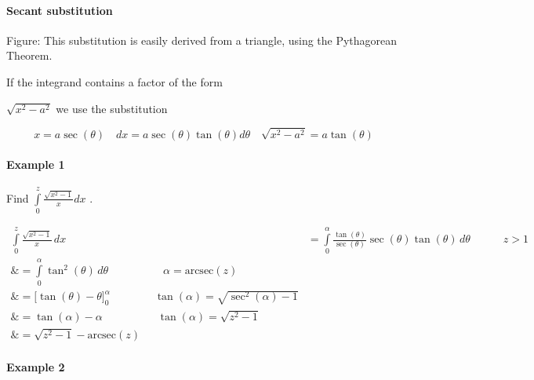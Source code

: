 \paragraph{Secant substitution}






Figure: This substitution is easily derived from a triangle, using the Pythagorean Theorem.



If the integrand contains a factor of the form

$\displaystyle\sqrt{x^2-a^2}$ we use the substitution



$$x=a\sec(\theta)\quad dx=a\sec(\theta)\tan(\theta)d\theta\quad\sqrt{x^2-a^2}=a\tan(\theta)$$



\paragraph{Example 1}



Find $\int\limits _0^z \frac{\sqrt{x^2-1}}{x}dx$ .



\begin{align}
\int\limits _0^z \frac{\sqrt{x^2-1}}{x}\,dx

&= \int\limits _0^\alpha \frac{\tan(\theta)}{\sec(\theta)}\sec(\theta)\tan(\theta)\,d\theta \quad\quad\quad z > 1 \\\&= \int\limits _0^\alpha \tan^2(\theta)\,d\theta \quad\quad\quad\quad\quad \alpha = \text{arcsec}(z) \\\&= \bigg[\tan(\theta) - \theta\bigg] _0^\alpha \quad\quad\quad\quad \tan(\alpha) = \sqrt{\sec^2(\alpha) - 1} \\\&= \tan(\alpha) - \alpha \quad\quad\quad\quad\quad \tan(\alpha) = \sqrt{z^2 - 1} \\\&= \sqrt{z^2 - 1} - \text{arcsec}(z)
\end{align}





\paragraph{Example 2}



